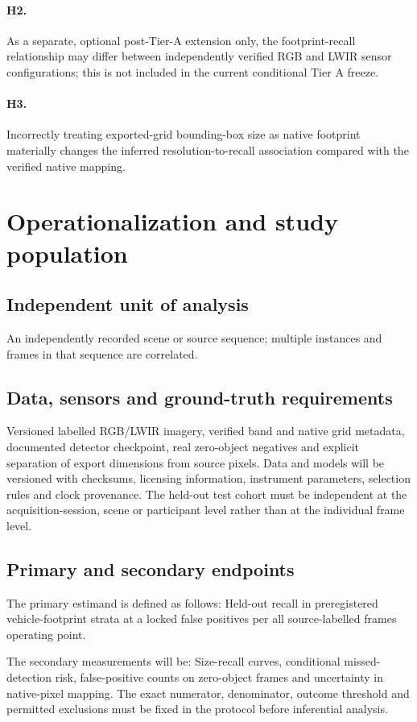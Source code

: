 \documentclass[11pt,a4paper]{article}
\begin{document}
\paragraph{H2.} As a separate, optional post-Tier-A extension only, the footprint-recall relationship may differ between independently verified RGB and LWIR sensor configurations; this is not included in the current conditional Tier A freeze.

\paragraph{H3.} Incorrectly treating exported-grid bounding-box size as native footprint materially changes the inferred resolution-to-recall association compared with the verified native mapping.

\section{Operationalization and study population}
\subsection{Independent unit of analysis}
An independently recorded scene or source sequence; multiple instances and frames in that sequence are correlated.

\subsection{Data, sensors and ground-truth requirements}
Versioned labelled RGB/LWIR imagery, verified band and native grid metadata, documented detector checkpoint, real zero-object negatives and explicit separation of export dimensions from source pixels. Data and models will be versioned with checksums, licensing information, instrument parameters, selection rules and clock provenance. The held-out test cohort must be independent at the acquisition-session, scene or participant level rather than at the individual frame level.

\subsection{Primary and secondary endpoints}
The primary estimand is defined as follows: Held-out recall in preregistered vehicle-footprint strata at a locked false positives per all source-labelled frames operating point.

The secondary measurements will be: Size-recall curves, conditional missed-detection risk, false-positive counts on zero-object frames and uncertainty in native-pixel mapping. The exact numerator, denominator, outcome threshold and permitted exclusions must be fixed in the protocol before inferential analysis.
\end{document}
